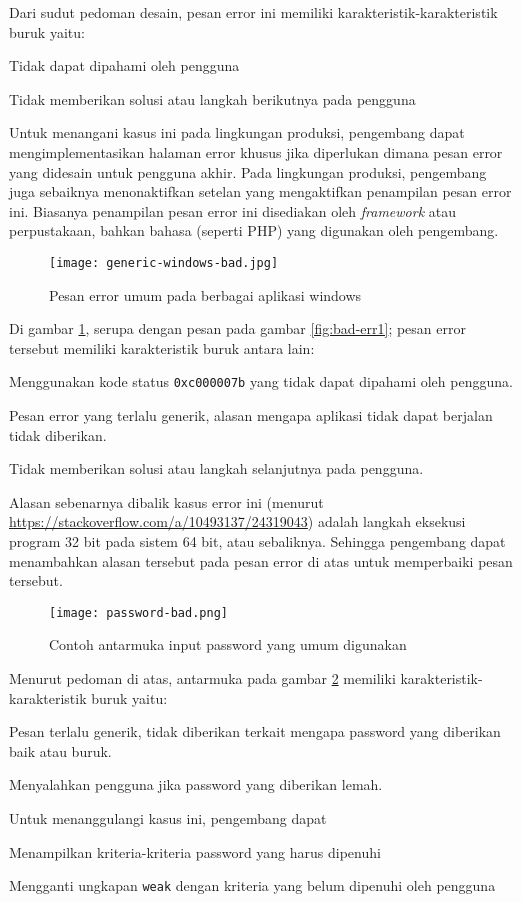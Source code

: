 Dari sudut pedoman desain, pesan error ini memiliki
karakteristik-karakteristik buruk yaitu:
\begin{cons}
\item Tidak dapat dipahami oleh pengguna
\item Tidak memberikan solusi atau langkah berikutnya pada pengguna
\end{cons}
Untuk menangani kasus ini pada lingkungan produksi, pengembang dapat
mengimplementasikan halaman error khusus jika diperlukan dimana pesan
error yang didesain untuk pengguna akhir. Pada lingkungan produksi,
pengembang juga sebaiknya menonaktifkan setelan yang mengaktifkan
penampilan pesan error ini. Biasanya penampilan pesan error ini
disediakan oleh \textit{framework} atau perpustakaan, bahkan bahasa
(seperti PHP) yang digunakan oleh pengembang.

\begin{figure}[H]
  \centering
  \texttt{[image: generic-windows-bad.jpg]}
  \caption{Pesan error umum pada berbagai aplikasi windows}
  \label{fig:bad-err4}
\end{figure}
Di gambar \ref{fig:bad-err4}, serupa dengan pesan pada gambar
\ref{fig:bad-err1}; pesan error tersebut memiliki karakteristik buruk
antara lain:
\begin{cons}
\item Menggunakan kode status \texttt{0xc000007b} yang tidak dapat
  dipahami oleh pengguna.
\item Pesan error yang terlalu generik, alasan mengapa aplikasi tidak
  dapat berjalan tidak diberikan.
\item Tidak memberikan solusi atau langkah selanjutnya pada pengguna.
\end{cons}
Alasan sebenarnya dibalik kasus error ini (menurut
\url{https://stackoverflow.com/a/10493137/24319043}) adalah langkah
eksekusi program 32 bit pada sistem 64 bit, atau sebaliknya. Sehingga
pengembang dapat menambahkan alasan tersebut pada pesan error di atas
untuk memperbaiki pesan tersebut.

\begin{figure}[H]
  \centering
  \texttt{[image: password-bad.png]}
  \caption{Contoh antarmuka input password yang umum digunakan}
  \label{fig:bad-err5}
\end{figure}
Menurut pedoman di atas, antarmuka pada gambar \ref{fig:bad-err5}
memiliki karakteristik-karakteristik buruk yaitu:
\begin{cons}
\item Pesan terlalu generik, tidak diberikan terkait mengapa password
  yang diberikan baik atau buruk.
\item Menyalahkan pengguna jika password yang diberikan lemah.
\end{cons}
Untuk menanggulangi kasus ini, pengembang dapat
\begin{pros}
\item Menampilkan kriteria-kriteria password yang harus dipenuhi
\item Mengganti ungkapan \texttt{weak} dengan kriteria yang belum
  dipenuhi oleh pengguna
\end{pros}


